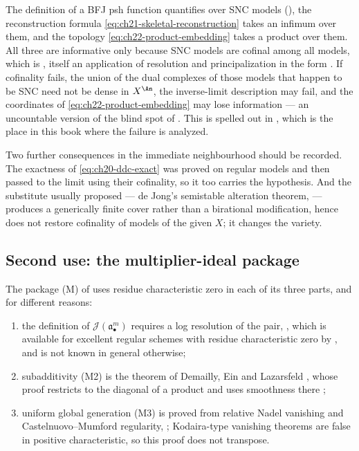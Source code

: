The definition of a BFJ psh function quantifies over SNC models
(), the reconstruction formula
\eqref{eq:ch21-skeletal-reconstruction} takes an infimum over them, and the
topology \eqref{eq:ch22-product-embedding} takes a product over them.  All
three are informative only because SNC models are cofinal among all models,
which is , itself an application of resolution and
principalization in the form .  If cofinality
fails, the union of the dual complexes of those models that happen to be SNC
need not be dense in $X^{\An}$, the inverse-limit description
 may fail, and the coordinates of
\eqref{eq:ch22-product-embedding} may lose information --- an uncountable
version of the blind spot of
.  This is spelled out in
, which is the place in this book where the
failure is analyzed.

Two further consequences in the immediate neighbourhood should be recorded.
The exactness of \eqref{eq:ch20-ddc-exact} was proved on regular models and
then passed to the limit using their cofinality, so it too carries the
hypothesis.  And the substitute usually proposed --- de Jong's semistable
alteration theorem,  --- produces a generically
finite cover rather than a birational modification, hence does not restore
cofinality of models of the given $X$; it changes the variety.

\subsection{Second use: the multiplier-ideal package}

The package \textup{(M)} of  uses residue
characteristic zero in each of its three parts, and for different reasons:

\begin{enumerate}
\item the definition of $\mathcal J(\mathfrak a_\bullet^m)$ requires a log
resolution of the pair, , which is available
for excellent regular schemes with residue characteristic zero by
, and is not known in general otherwise;
\item subadditivity (M2) is the theorem of Demailly, Ein and Lazarsfeld
, whose proof restricts to the
diagonal of a product and uses smoothness there
\cite[Theorem~2.3]{DEL00};
\item uniform global generation (M3) is proved from relative Nadel vanishing
and Castelnuovo--Mumford regularity, ;
Kodaira-type vanishing theorems are false in positive characteristic, so
this proof does not transpose.
\end{enumerate}

